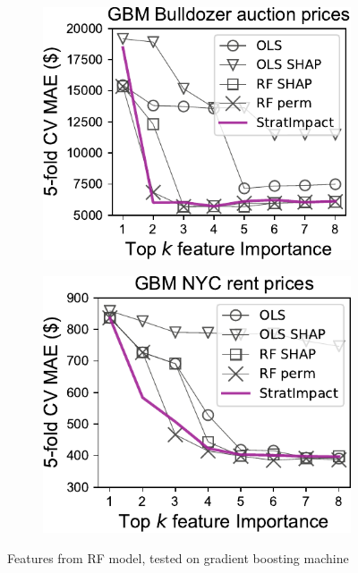 \documentclass[twoside,11pt]{article}
\begin{document}
\begin{figure}
\begin{subfigure}{.25\textwidth}
    \centering
\includegraphics[scale=0.5]{images/bulldozer-topk-GBM-Importance.pdf}
\end{subfigure}%
\hfill
\begin{subfigure}{.2\textwidth}
    \centering
\includegraphics[scale=0.5]{images/rent-topk-GBM-Importance.pdf}
\end{subfigure}
\caption[short]{Features from RF model, tested on gradient boosting machine}
\label{fig:topk}
\end{figure}
\end{document}
